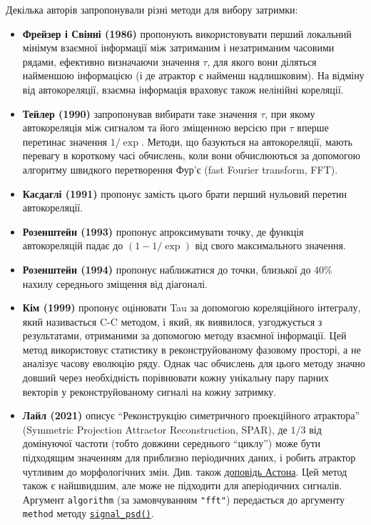 \documentclass[
  letterpaper,
]{report}
\providecommand{\tightlist}{%
  \setlength{\itemsep}{0pt}\setlength{\parskip}{0pt}}\usepackage{longtable,booktabs,array}
\begin{document}
Декілька авторів запропонували різні методи для вибору затримки:

\begin{itemize}
\tightlist
\item
  \textbf{Фрейзер і Свінні (1986)} пропонують використовувати перший
  локальний мінімум взаємної інформації між затриманим і незатриманим
  часовими рядами, ефективно визначаючи значення \(\tau\), для якого
  вони діляться найменшою інформацією (і де атрактор є найменш
  надлишковим). На відміну від автокореляції, взаємна інформація
  враховує також нелінійні кореляції.
\item
  \textbf{Тейлер (1990)} запропонував вибирати таке значення \(\tau\),
  при якому автокореляція між сигналом та його зміщенною версією при
  \(\tau\) вперше перетинає значення \(1/\exp\). Методи, що базуються на
  автокореляції, мають перевагу в короткому часі обчислень, коли вони
  обчислюються за допомогою алгоритму швидкого перетворення Фур'є (fast
  Fourier transform, FFT).
\item
  \textbf{Касдаглі (1991)} пропонує замість цього брати перший нульовий
  перетин автокореляції.
\item
  \textbf{Розенштейн (1993)} пропонує апроксимувати точку, де функція
  автокореляцій падає до \(\left( 1-1/\exp \right)\) від свого
  максимального значення.
\item
  \textbf{Розенштейн (1994)} пропонує наближатися до точки, близької до
  40\% нахилу середнього зміщення від діагоналі.
\item
  \textbf{Кім (1999)} пропонує оцінювати Tau за допомогою кореляційного
  інтегралу, який називається C-C методом, і який, як виявилося,
  узгоджується з результатами, отриманими за допомогою методу взаємної
  інформації. Цей метод використовує статистику в реконструйованому
  фазовому просторі, а не аналізує часову еволюцію ряду. Однак час
  обчислень для цього методу значно довший через необхідність
  порівнювати кожну унікальну пару парних векторів у реконструйованому
  сигналі на кожну затримку.
\item
  \textbf{Лайл (2021)} описує ``Реконструкцію симетричного проекційного
  атрактора'' (Symmetric Projection Attractor Reconstruction, SPAR), де
  \(1/3\) від домінуючої частоти (тобто довжини середнього ``циклу'')
  може бути підходящим значенням для приблизно періодичних даних, і
  робить атрактор чутливим до морфологічних змін. Див. також
  \href{https://youtu.be/GGrOJtcTcHA?t=730}{доповідь Астона}. Цей метод
  також є найшвидшим, але може не підходити для аперіодичних сигналів.
  Аргумент \texttt{algorithm} (за замовчуванням \texttt{"fft"})
  передається до аргументу \texttt{method} методу
  \href{https://neuropsychology.github.io/NeuroKit/functions/signal.html\#signal-psd}{\texttt{signal\_psd()}}.
\end{itemize}
\end{document}
